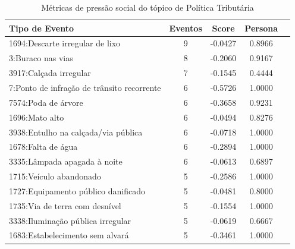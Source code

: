 \begin{table}[htbp]
	\centering
	\caption{Métricas de pressão social do tópico de Política Tributária}
	\label{tab:eventos_populares_taxes}
	\begin{tabular}{|l|c|c|c|c|}
		\hline
		\textbf{Tipo de Evento}                               & \textbf{Eventos} & \textbf{Score} & \textbf{Persona} \\
		\hline
		1694:Descarte irregular de lixo                       & 9                & -0.0427        & 0.8966           \\
		\hline
		3:Buraco nas vias                                     & 8                & -0.2060        & 0.9167           \\
		\hline
		3917:Calçada irregular                                & 7                & -0.1545        & 0.4444           \\
		\hline
		7:Ponto de infração de trânsito recorrente            & 6                & -0.5726        & 1.0000           \\
		\hline
		7574:Poda de árvore                                   & 6                & -0.3658        & 0.9231           \\
		\hline
		1696:Mato alto                                        & 6                & -0.0494        & 0.8276           \\
		\hline
		3938:Entulho na calçada/via pública                   & 6                & -0.0718        & 1.0000           \\
		\hline
		1678:Falta de água                                    & 6                & -0.2894        & 1.0000           \\
		\hline
		3335:Lâmpada apagada à noite                          & 6                & -0.0613        & 0.6897           \\
		\hline
		1715:Veículo abandonado                               & 5                & -0.2586        & 1.0000           \\
		\hline
		1727:Equipamento público danificado                   & 5                & -0.0481        & 0.8000           \\
		\hline
		1735:Via de terra com desnível                        & 5                & -0.1554        & 1.0000           \\
		\hline
		3338:Iluminação pública irregular                     & 5                & -0.0619        & 0.6667           \\
		\hline
		1683:Estabelecimento sem alvará                       & 5                & -0.3461        & 1.0000           \\

\end{tabular}
\end{table}
